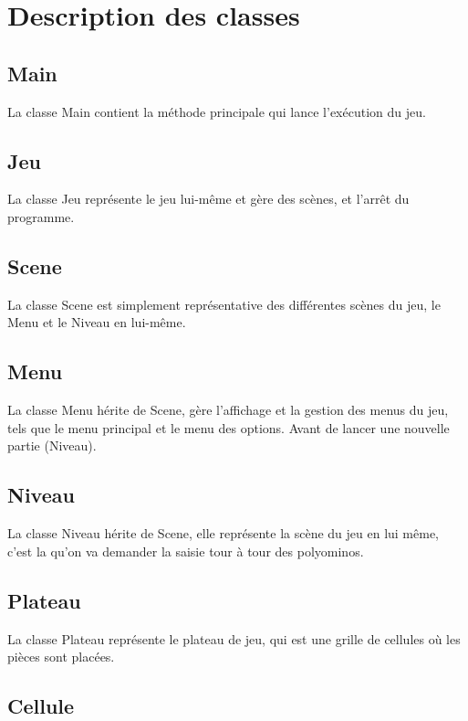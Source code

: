 \chapter{Description des classes}

\section{Main}

La classe Main contient la méthode principale qui lance l'exécution du jeu.

\section{Jeu}

La classe Jeu représente le jeu lui-même et gère des scènes, et l'arrêt du programme.

\section{Scene}

La classe Scene est simplement représentative des différentes scènes du jeu, le Menu et le Niveau en lui-même.

\section{Menu}

La classe Menu hérite de Scene, gère l'affichage et la gestion des menus du jeu, tels que le menu principal et le menu des options. Avant de lancer une nouvelle partie (Niveau).

\section{Niveau}

La classe Niveau hérite de Scene, elle représente la scène du jeu en lui même, c'est la qu'on va demander la saisie tour à tour des polyominos.

\section{Plateau}

La classe Plateau représente le plateau de jeu, qui est une grille de cellules où les pièces sont placées.

\section{Cellule}

